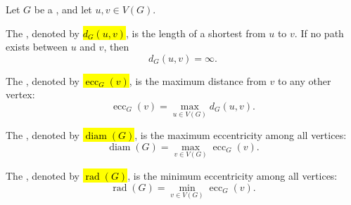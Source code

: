 \begin{definition} \label{definition:distance_diameter_radius_of_a_graph}
Let $G$ be a , and let $u, v \in V(G)$.

The , denoted by \hl{$d_G(u,v)$}, is the length of a shortest  from $u$ to $v$. If no path exists between $u$ and $v$, then
$$d_G(u,v) = \infty.$$

The , denoted by \hl{$\operatorname{ecc}_G(v)$}, is the maximum distance from $v$ to any other vertex:
$$\operatorname{ecc}_G(v) = \max_{u \in V(G)} d_G(u,v).$$

The , denoted by \hl{$\operatorname{diam}(G)$}, is the maximum eccentricity among all vertices:
$$\operatorname{diam}(G) = \max_{v \in V(G)} \operatorname{ecc}_G(v).$$

The , denoted by \hl{$\operatorname{rad}(G)$}, is the minimum eccentricity among all vertices:
$$\operatorname{rad}(G) = \min_{v \in V(G)} \operatorname{ecc}_G(v).$$
\end{definition}
